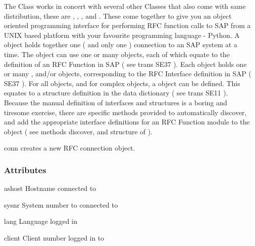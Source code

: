 \documentclass{howto}
\begin{document}
The  Class works in concert with several other Classes that
also come with same distribution, these are , ,
, and .  These come
together to give you an object oriented programming interface for
performing RFC function calls to SAP from a UNIX based platform with
your favourite programming language - Python.
A  object holds together one ( and only one ) connection to an
SAP system at a time.  The  object can use one or many 
objects, each of which equate to the definition of an RFC Function in
SAP ( see trans SE37 ). Each  object holds one or many
, and/or  objects, corresponding to
the RFC Interface definition in SAP ( SE37 ).
For all  objects, and for complex  objects,
a  object can be defined.  This equates to a
structure definition in the data dictionary ( see trans SE11 ).
Because the manual definition of interfaces and structures is a boring
and tiresome exercise, there are specific methods provided to 
automatically discover, and add the appropriate interface definitions
for an RFC Function module to the  object ( see methods
discover, and structure of  ).


\begin{funcdesc}{conn}{}
creates a new RFC connection object.
\end{funcdesc}


\subsubsection{Attributes \label{connattrs}}

\begin{memberdesc}[conn]{ashost}
    Hostname connected to 
\end{memberdesc}

\begin{memberdesc}[conn]{sysnr}
    System number to connected to
\end{memberdesc}

\begin{memberdesc}[conn]{lang}
    Language logged in 
\end{memberdesc}

\begin{memberdesc}[conn]{client}
    Client number logged in to
\end{memberdesc}
\end{document}
